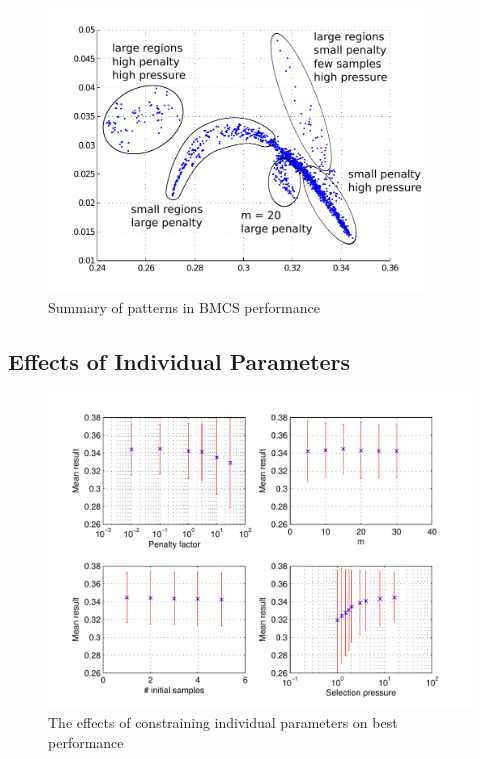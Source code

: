 \documentclass[10pt]{article}
\begin{document}
\begin{itemize}
\begin{figure}
  \begin{center}
    \includegraphics[width=10cm]{bmcs_perf_summary.pdf}
    \end{center}
    \caption{Summary of patterns in BMCS performance}
    \label{fig:bmcs_perf_summary}
    \end{figure}

\end{itemize}

\subsection{Effects of Individual Parameters}

\begin{figure}
  \begin{center}
    \includegraphics[width=15cm]{bmcs_plots.pdf}
    \end{center}
    \caption{The effects of constraining individual parameters on best
    performance}
    \label{fig:bmcs_plots}
    \end{figure}
\end{document}
